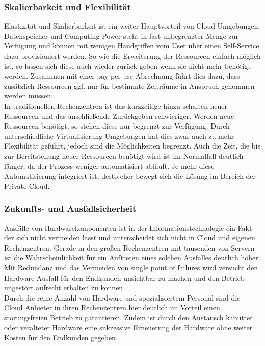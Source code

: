 \subsubsection{Skalierbarkeit und Flexibilität}\label{skalierbarkeit}
Elastizität und Skalierbarkeit ist ein weiter Hauptvorteil von Cloud Umgebungen. Datenspeicher und Computing Power steht in fast unbegrenzter Menge zur Verfügung und können mit wenigen Handgriffen vom User über einen Self-Service dazu provisioniert werden. So wie die Erweiterung der Ressourcen einfach möglich ist, so lassen sich diese auch wieder zurück geben wenn sie nicht mehr benötigt werden. Zusammen mit einer pay-per-use Abrechnung führt dies dazu, dass zusätzlich Ressourcen ggf. nur für bestimmte Zeiträume in Anspruch genommen werden müssen. \\
In traditionellen Rechenzentren ist das kurzzeitige hinzu schalten neuer Ressourcen und das anschließende Zurückgeben schwieriger. Werden neue Ressourcen benötigt, so stehen diese nur begrenzt zur Verfügung. Durch unterschiedliche Virtualisierung Umgebungen hat dies zwar auch zu mehr Flexibilität geführt, jedoch sind die Möglichkeiten begrenzt. Auch die Zeit, die bis zur Bereitstellung neuer Ressourcen benötigt wird ist im Normalfall deutlich länger, da der Prozess weniger automatisiert abläuft. Je mehr diese Automatisierung integriert ist, desto eher bewegt sich die Lösung im Bereich der Private Cloud.

\subsubsection{Zukunfts- und Ausfallsicherheit}\label{zukunftssicherheit}
Ausfälle von Hardwarekomponenten ist in der Informationstechnologie ein Fakt der sich nicht vermeiden lässt und unterscheidet sich nicht in Cloud und eigenen Rechenzentren. Gerade in den großen Rechenzentren mit tausenden von Servern ist die Wahrscheinlichkeit für ein Auftreten eines solchen Ausfalles deutlich höher. Mit Redundanz und das Vermeiden von single point of failures wird versucht den Hardware Ausfall für den Endkunden unsichtbar zu machen und den Betrieb ungestört aufrecht erhalten zu können. \\
Durch die reine Anzahl von Hardware und spezialisiertem Personal sind die Cloud Anbieter in ihren Rechenzentren hier deutlich im Vorteil einen störungsfreien Betrieb zu garantieren. Zudem ist durch den Austausch kaputter oder veralteter Hardware eine sukzessive Erneuerung der Hardware ohne weiter Kosten für den Endkunden gegeben.

